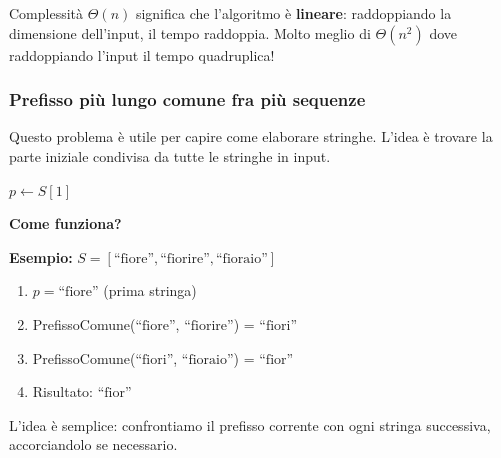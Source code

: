 \begin{nota}
	Complessità $\Theta(n)$ significa che l'algoritmo è \textbf{lineare}: raddoppiando la dimensione dell'input, il tempo raddoppia. Molto meglio di $\Theta(n^2)$ dove raddoppiando l'input il tempo quadruplica!
\end{nota}

\pagebreak
\subsubsection*{Prefisso più lungo comune fra più sequenze}

\begin{softnote}
	Questo problema è utile per capire come elaborare stringhe. L'idea è trovare la parte iniziale condivisa da tutte le stringhe in input.
\end{softnote}

\begin{algorithm}[H]
	\caption{Prefisso comune più lungo}
	\label{alg:prefisso-comune}
	
	
	
	$p \gets S[1]$
	
	
\end{algorithm}

\begin{softnote}
	\textbf{Come funziona?}
	
	\textbf{Esempio:} $S = [\text{``fiore''}, \text{``fiorire''}, \text{``fioraio''}]$
	\begin{enumerate}
		\item $p = \text{``fiore''}$ (prima stringa)
		\item PrefissoComune($\text{``fiore''}$, $\text{``fiorire''}$) = $\text{``fiori''}$
		\item PrefissoComune($\text{``fiori''}$, $\text{``fioraio''}$) = $\text{``fior''}$
		\item Risultato: $\text{``fior''}$
	\end{enumerate}
	
	L'idea è semplice: confrontiamo il prefisso corrente con ogni stringa successiva, accorciandolo se necessario.
\end{softnote}

